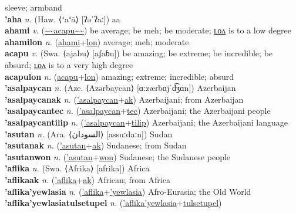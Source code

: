 sleeve; armband \label{ampoltilum} \\
\textbf{'aha} \textit{n.} (Haw. ⟨ʻaʻā⟩ [ʔəˈʔaː])
aa \label{'aha} \\
\textbf{ahami} \textit{v.} (\hyperref[acapu]{\~{}\~{}acapu\~{}\~{}})
be average; be meh; be moderate; \hyperref[ahamilon]{ʟᴏᴧ} is to a low degree \label{ahami} \\
\textbf{ahamilon} \textit{n.} (\hyperref[ahami]{ahami}+\hyperref[lon]{lon})
average; meh; moderate \label{ahamilon} \\
\textbf{acapu} \textit{v.} (Swa. ⟨ajabu⟩ [aʄaɓu])
be amazing; be extreme; be incredible; be absurd; \hyperref[acapulon]{ʟᴏᴧ} is to a very high degree \label{acapu} \\
\textbf{acapulon} \textit{n.} (\hyperref[acapu]{acapu}+\hyperref[lon]{lon})
amazing; extreme; incredible; absurd \label{acapulon} \\
\textbf{'asalpaycan} \textit{n.} (Aze. ⟨Azərbaycan⟩ [ɑːzæɾbɑjˈd͡ʒɑn])
Azerbaijan \label{'asalpaycan} \\
\textbf{'asalpaycanak} \textit{n.} (\hyperref['asalpaycan]{'asalpaycan}+\hyperref[ak]{ak})
Azerbaijani; from Azerbaijan \label{'asalpaycanak} \\
\textbf{'asalpaycantec} \textit{n.} (\hyperref['asalpaycan]{'asalpaycan}+\hyperref[tec]{tec})
Azerbaijani; the Azerbaijani people \label{'asalpaycantec} \\
\textbf{'asalpaycantilip} \textit{n.} (\hyperref['asalpaycan]{'asalpaycan}+\hyperref[tilip]{tilip})
Azerbaijani; the Azerbaijani language \label{'asalpaycantilip} \\
\textbf{'asutan} \textit{n.} (Ara. ⟨السودان‎⟩ [assuːdaːn])
Sudan \label{'asutan} \\
\textbf{'asutanak} \textit{n.} (\hyperref['asutan]{'asutan}+\hyperref[ak]{ak})
Sudanese; from Sudan \label{'asutanak} \\
\textbf{'asutanwon} \textit{n.} (\hyperref['asutan]{'asutan}+\hyperref[won]{won})
Sudanese; the Sudanese people \label{'asutanwon} \\
\textbf{'aflika} \textit{n.} (Swa. ⟨Afrika⟩ [afrika])
Africa \label{'aflika} \\
\textbf{'aflikaak} \textit{n.} (\hyperref['aflika]{'aflika}+\hyperref[ak]{ak})
African; from Africa \label{'aflikaak} \\
\textbf{'aflika'yewlasia} \textit{n.} (\hyperref['aflika]{'aflika}+\hyperref['yewlasia]{'yewlasia})
Afro-Eurasia; the Old World \label{'aflika'yewlasia} \\
\textbf{'aflika'yewlasiatulsetupel} \textit{n.} (\hyperref['aflika'yewlasia]{'aflika'yewlasia}+\hyperref[tulsetupel]{tulsetupel})
